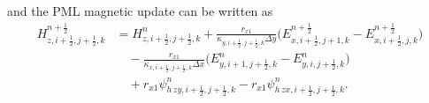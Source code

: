\documentclass{article}
\numberwithin{equation}{section}
\numberwithin{figure}{section}
\begin{document}
and the PML magnetic update can be written as
\begin{equation}
    \begin{aligned}
        H_{z,i+\tfrac12,j+\tfrac12,k}^{n+\frac12}
         & = H_{z,i+\tfrac12,j+\tfrac12,k}^{n}
        +\frac{r_{x1}}{\kappa_{y,i+\tfrac12,j+\tfrac12,k}\Delta y}
        \Big(E_{x,i+\tfrac12,j+1,k}^{n+\frac12}-E_{x,i+\tfrac12,j,k}^{n+\frac12}\Big) \\
         & \quad
        -\frac{r_{x1}}{\kappa_{x,i+\tfrac12,j+\tfrac12,k}\Delta x}
        \Big(E_{y,i+1,j+\tfrac12,k}^{n}-E_{y,i,j+\tfrac12,k}^{n}\Big)                 \\
         & \quad
        +r_{x1}\psi^{n}_{h\,zy,i+\tfrac12,j+\tfrac12,k}
        -r_{x1}\psi^{n}_{h\,zx,i+\tfrac12,j+\tfrac12,k}.
    \end{aligned}
    \label{eq:adi-first-hz-pml}
\end{equation}
\end{document}
